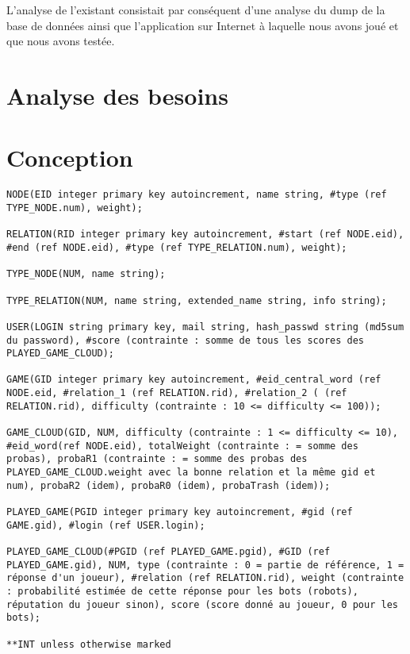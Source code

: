 \documentclass[a4paper,11pt,french]{article}
\begin{document}
L'analyse de l'existant consistait par conséquent d'une analyse du dump de la base de données ainsi que l'application sur Internet à laquelle nous avons joué et que nous avons testée. 






\section{Analyse des besoins}

\section{Conception}

\begin{verbatim}
NODE(EID integer primary key autoincrement, name string, #type (ref TYPE_NODE.num), weight);

RELATION(RID integer primary key autoincrement, #start (ref NODE.eid), #end (ref NODE.eid), #type (ref TYPE_RELATION.num), weight);

TYPE_NODE(NUM, name string);

TYPE_RELATION(NUM, name string, extended_name string, info string);

USER(LOGIN string primary key, mail string, hash_passwd string (md5sum du password), #score (contrainte : somme de tous les scores des PLAYED_GAME_CLOUD);

GAME(GID integer primary key autoincrement, #eid_central_word (ref NODE.eid, #relation_1 (ref RELATION.rid), #relation_2 ( (ref RELATION.rid), difficulty (contrainte : 10 <= difficulty <= 100));

GAME_CLOUD(GID, NUM, difficulty (contrainte : 1 <= difficulty <= 10), #eid_word(ref NODE.eid), totalWeight (contrainte : = somme des probas), probaR1 (contrainte : = somme des probas des PLAYED_GAME_CLOUD.weight avec la bonne relation et la même gid et num), probaR2 (idem), probaR0 (idem), probaTrash (idem));

PLAYED_GAME(PGID integer primary key autoincrement, #gid (ref GAME.gid), #login (ref USER.login);

PLAYED_GAME_CLOUD(#PGID (ref PLAYED_GAME.pgid), #GID (ref PLAYED_GAME.gid), NUM, type (contrainte : 0 = partie de référence, 1 = réponse d'un joueur), #relation (ref RELATION.rid), weight (contrainte : probabilité estimée de cette réponse pour les bots (robots), réputation du joueur sinon), score (score donné au joueur, 0 pour les bots);

**INT unless otherwise marked
\end{verbatim}
\end{document}
